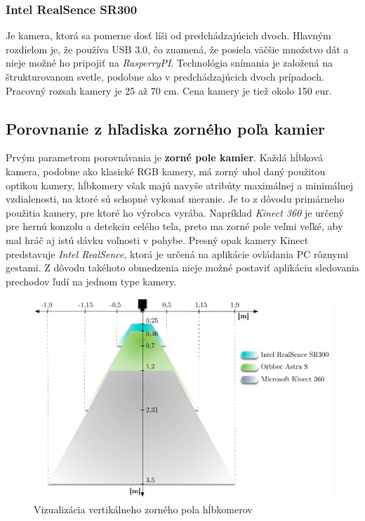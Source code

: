 \subsubsection{Intel RealSence SR300}
Je kamera, ktorá sa pomerne dosť líši od predchádzajúcich dvoch. Hlavným rozdielom je, že používa USB 3.0, čo znamená, že posiela väčšie množstvo dát a nieje možné ho pripojiť na \textit{RasperryPI}. Technológia snímania je založená na štrukturovanom svetle, podobne ako v predchádzajúcich dvoch prípadoch. Pracovný rozsah kamery je 25 až 70 cm. Cena kamery je tiež okolo 150 eur. 

\subsection{Porovnanie z hľadiska zorného poľa kamier}
Prvým parametrom porovnávania je \textbf{zorné pole kamier}. Každá hĺbková kamera, podobne ako klasické RGB kamery, má zorný uhol daný použitou optikou kamery, hĺbkomery však majú navyše atribúty maximálnej a minimálnej vzdialenosti, na ktoré sú schopné vykonať meranie. Je to z dôvodu primárneho použitia kamery, pre ktoré ho výrobca vyrába. Napríklad \textit{Kinect 360} je určený pre hernú konzolu a detekciu celého tela, preto ma zorné pole veľmi veľké, aby mal hráč aj istú dávku voľnosti v pohybe. Presný opak kamery Kinect predstavuje \textit{Intel RealSence}, ktorá je určená na aplikácie ovládania PC rôznymi gestami. Z dôvodu takéhoto obmedzenia nieje možné postaviť aplikáciu sledovania prechodov ľudí na jednom type kamery.



\begin{figure}[H]
\begin{center}
	\includegraphics[scale=0.60]{images/camerasViews}
	\caption{Vizualizácia vertikálneho zorného pola hĺbkomerov}
	\end{center}
\end{figure}

